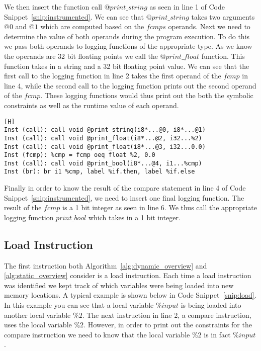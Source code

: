 We then insert the function call $@print\_string$ as seen in line 1 of Code Snippet~\ref{snip:instrumented}. We can see that $@print\_string$ takes two arguments $@0$ and $@1$ which are computed based on the $fcmps$ operands. Next we need to determine the value of both operands during the program execution. To do this we pass both operands to logging functions of the appropriate type. As we know the operands are 32 bit floating points we call the $@print\_float$ function. This function takes in a string and a 32 bit floating point value. We can see that the first call to the logging function in line 2 takes the first operand of the $fcmp$ in line 4, while the second call to the logging function prints out the second operand of the $fcmp$. These logging functions would thus print out the both the symbolic constraints as well as the runtime value of each operand.


\vspace{-0.6cm}

\begin{lstlisting}[caption={New Equivalent Instrumented Code}, label=snip:instrumented][H]
Inst (call): call void @print_string(i8*...@0, i8*...@1)
Inst (call): call void @print_float(i8*...@2, i32...%2)
Inst (call): call void @print_float(i8*...@3, i32...0.0)
Inst (fcmp): %cmp = fcmp oeq float %2, 0.0
Inst (call): call void @print_bool(i8*...@4, i1...%cmp)
Inst (br): br i1 %cmp, label %if.then, label %if.else
\end{lstlisting}

Finally in order to know the result of the compare statement in line 4 of Code Snippet~\ref{snip:instrumented}, we need to insert one final logging function. The result of the $fcmp$ is a 1 bit integer as seen in line 6. We thus call the appropriate logging function $print\_bool$ which takes in a 1 bit integer.

\subsection{Load Instruction}

The first instruction both Algorithm~\ref{alg:dynamic_overview} and \ref{alg:static_overview} consider is a load instruction\cite{loadinstruction}. Each time a load instruction was identified we kept track of which variables were being loaded into new memory locations. A typical example is shown below in Code Snippet~\ref{snip:load}. In this example you can see that a local variable $\%input$ is being loaded into another local variable $\%2$. The next instruction in line 2, a compare instruction, uses the local variable $\%2$. However, in order to print out the constraints for the compare instruction we need to know that the local variable $\%2$ is in fact $\%input$.

